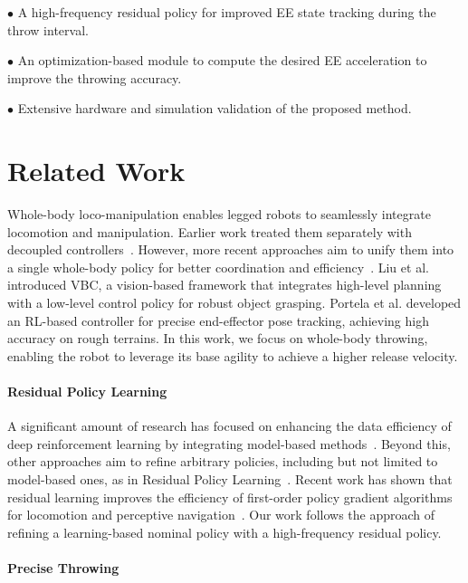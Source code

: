\documentclass[letterpaper, 10 pt, conference]{ieeeconf} %
\begin{document}
$\bullet$ A high-frequency residual policy for improved EE state tracking during the throw interval.

$\bullet$ An optimization-based module to compute the desired EE acceleration to improve the throwing accuracy.

$\bullet$ Extensive hardware and simulation validation of the proposed method.

%

\section{Related Work}

Whole-body loco-manipulation enables legged robots to seamlessly integrate locomotion and manipulation. Earlier work treated them separately with decoupled controllers~\cite{ma2022combining}. However, more recent approaches aim to unify them into a single whole-body policy for better coordination and efficiency~\cite{fu2022deep}. Liu et al.\cite{liu2024visual} introduced VBC, a vision-based framework that integrates high-level planning with a low-level control policy for robust object grasping. Portela et al.\cite{portela2024whole} developed an RL-based controller for precise end-effector pose tracking, achieving high accuracy on rough terrains. In this work, we focus on whole-body throwing, enabling the robot to leverage its base agility to achieve a higher release velocity.

\paragraph{Residual Policy Learning}

A significant amount of research has focused on enhancing the data efficiency of deep reinforcement learning by integrating model-based methods~\cite{mordatch2016combining, nagabandi2018neural, tan2018sim, johannink2019residual}. Beyond this, other approaches aim to refine arbitrary policies, including but not limited to model-based ones, as in Residual Policy Learning~\cite{silver2018residual}. Recent work has shown that residual learning improves the efficiency of first-order policy gradient algorithms for locomotion and perceptive navigation~\cite{luo2024residual}. Our work follows the approach of refining a learning-based nominal policy with a high-frequency residual policy.

\paragraph{Precise Throwing}
\end{document}
